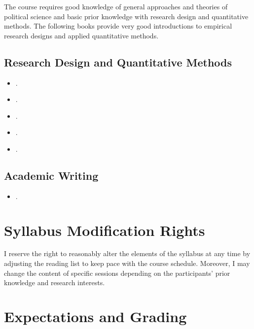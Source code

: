 \documentclass[abstract=on,parskip=full,headings=standardclasses,fontsize=11pt,paper=a4]{scrartcl}
\begin{document}
The course requires good knowledge of general approaches and theories of political science and basic prior knowledge with research design and quantitative methods. The following books provide very good introductions to empirical research designs and applied quantitative methods.

\subsection*{Research Design and Quantitative Methods}
\begin{itemize}
\item {}.
\item {}.
\item {}.
\item {}.
\item {}.
\end{itemize}

\subsection*{Academic Writing}
\begin{itemize}
\item {}.
\end{itemize}


\section*{Syllabus Modification Rights}

I reserve the right to reasonably alter the elements of the syllabus at any time by adjusting the reading list to keep pace with the course schedule. Moreover, I may change the content of specific sessions depending on the participants' prior knowledge and research interests.


\section*{Expectations and Grading}
\end{document}
